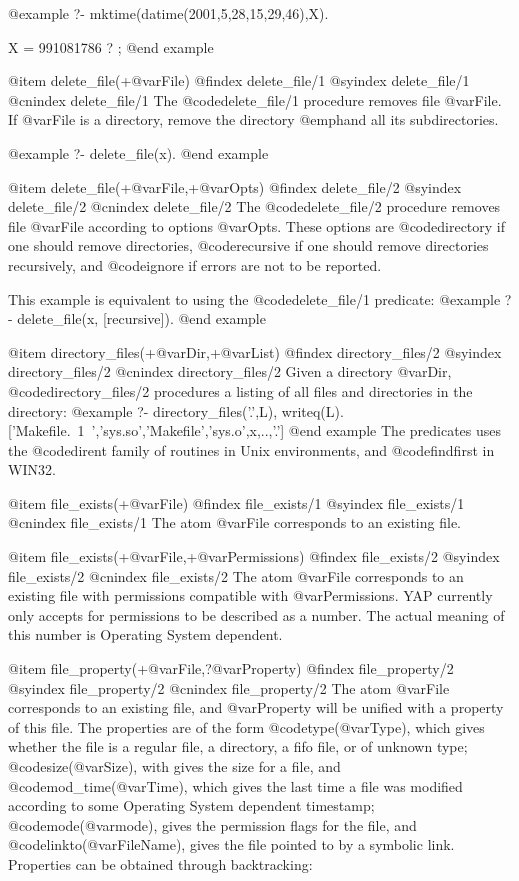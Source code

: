 {{{{{{{{{@example
   ?- mktime(datime(2001,5,28,15,29,46),X).

X = 991081786 ? ;
@end example

@item delete_file(+@var{File})
@findex  delete_file/1
@syindex delete_file/1
@cnindex delete_file/1
The @code{delete_file/1} procedure removes file @var{File}. If
@var{File} is a directory, remove the directory @emph{and all its
subdirectories}.

@example
   ?- delete_file(x).
@end example

@item delete_file(+@var{File},+@var{Opts})
@findex  delete_file/2
@syindex delete_file/2
@cnindex delete_file/2
The @code{delete_file/2} procedure removes file @var{File} according to
options @var{Opts}. These options are @code{directory} if one should
remove directories, @code{recursive} if one should remove directories
recursively, and @code{ignore} if errors are not to be reported.

This example is equivalent to using the @code{delete_file/1} predicate:
@example
   ?- delete_file(x, [recursive]).
@end example


@item directory_files(+@var{Dir},+@var{List})
@findex  directory_files/2
@syindex directory_files/2
@cnindex directory_files/2
Given a directory @var{Dir},  @code{directory_files/2} procedures a
listing of all files and directories in the directory:
@example
    ?- directory_files('.',L), writeq(L).
['Makefile.~1~','sys.so','Makefile','sys.o',x,..,'.']
@end example
The predicates uses the @code{dirent} family of routines in Unix
environments, and @code{findfirst} in WIN32.

@item file_exists(+@var{File})
@findex  file_exists/1
@syindex file_exists/1
@cnindex file_exists/1
The atom @var{File} corresponds to an existing file.

@item file_exists(+@var{File},+@var{Permissions})
@findex  file_exists/2
@syindex file_exists/2
@cnindex file_exists/2
The atom @var{File} corresponds to an existing file with permissions
compatible with @var{Permissions}. YAP currently only accepts for
permissions to be described as a number. The actual meaning of this
number is Operating System dependent.

@item file_property(+@var{File},?@var{Property})
@findex  file_property/2
@syindex file_property/2
@cnindex file_property/2
The atom @var{File} corresponds to an existing file, and @var{Property}
will be unified with a property of this file. The properties are of the
form @code{type(@var{Type})}, which gives whether the file is a regular
file, a directory, a fifo file, or of unknown type;
@code{size(@var{Size})}, with gives the size for a file, and
@code{mod_time(@var{Time})}, which gives the last time a file was
modified according to some Operating System dependent
timestamp; @code{mode(@var{mode})}, gives the permission flags for the
file, and @code{linkto(@var{FileName})}, gives the file pointed to by a
symbolic link. Properties can be obtained through backtracking:

}}}}}}}}}
